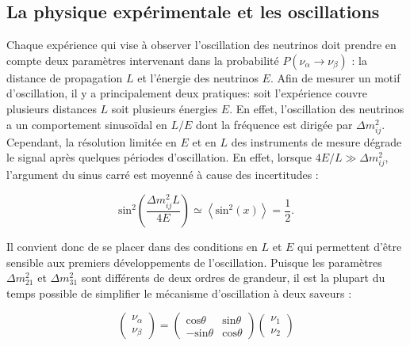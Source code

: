 \bigbreak

\subsection{La physique expérimentale et les oscillations}

%

Chaque expérience qui vise à observer l'oscillation des neutrinos doit prendre en compte deux paramètres intervenant dans la probabilité $P(\nu_\alpha \rightarrow \nu_\beta )$ : la distance de propagation $L$ et l'énergie des neutrinos $E$. Afin de mesurer un motif d'oscillation, il y a principalement deux pratiques: soit l'expérience couvre plusieurs distances $L$ soit plusieurs énergies $E$. En effet, l'oscillation des neutrinos a un comportement sinusoïdal en $L/E$ dont la fréquence est dirigée par $\Delta m^2_{ij}$. Cependant, la résolution limitée en $E$ et en $L$ des instruments de mesure dégrade le signal après quelques périodes d'oscillation. En effet, lorsque $4E/L \gg \Delta m_{ij}^2$, l'argument du sinus carré est moyenné à cause des incertitudes :

\begin{equation}
    \textrm{sin}^2\left(\frac{\Delta m_{ij}^2 L}{4E} \right) \simeq \left< \textrm{sin}^2\left(x\right) \right> = \frac{1}{2}.
\end{equation}

\bigbreak

Il convient donc de se placer dans des conditions en $L$ et $E$ qui permettent d'être sensible aux premiers développements de l'oscillation. Puisque les paramètres $\Delta m_{21}^2$ et $\Delta m^2_{31}$ sont différents de deux ordres de grandeur, il est la plupart du temps possible de simplifier le mécanisme d'oscillation à deux saveurs :

\begin{equation}
\left( \begin{matrix}
    \nu_\alpha\\
    \nu_\beta
\end{matrix} \right) = \left( \begin{matrix}
    \textrm{cos} \theta & \textrm{sin}\theta \\
    - \textrm{sin} \theta & \textrm{cos}\theta
\end{matrix} \right) \left( \begin{matrix}
    \nu_1 \\
    \nu_2
\end{matrix} \right)
\end{equation}

